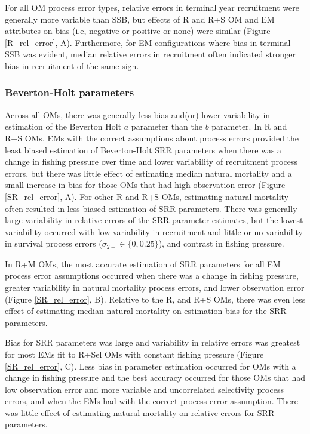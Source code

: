\documentclass[
  12pt,
]{article}
\begin{document}
For all OM process error types, relative errors in terminal year
recruitment were generally more variable than SSB, but effects of R and
R+S OM and EM attributes on bias (i.e, negative or positive or none)
were similar (Figure \ref{R_rel_error}, A). Furthermore, for EM
configurations where bias in terminal SSB was evident, median relative
errors in recruitment often indicated stronger bias in recruitment of
the same sign.

\hypertarget{beverton-holt-parameters}{%
\subsubsection*{Beverton-Holt
parameters}\label{beverton-holt-parameters}}

Across all OMs, there was generally less bias and(or) lower variability
in estimation of the Beverton Holt \(a\) parameter than the \(b\)
parameter. In R and R+S OMs, EMs with the correct assumptions about
process errors provided the least biased estimation of Beverton-Holt SRR
parameters when there was a change in fishing pressure over time and
lower variability of recruitment process errors, but there was little
effect of estimating median natural mortality and a small increase in
bias for those OMs that had high observation error (Figure
\ref{SR_rel_error}, A). For other R and R+S OMs, estimating natural
mortality often resulted in less biased estimation of SRR parameters.
There was generally large variability in relative errors of the SRR
parameter estimates, but the lowest variability occurred with low
variability in recruitment and little or no variability in survival
process errors (\(\sigma_{2+} \in \{0,0.25\}\)), and contrast in fishing
pressure.

In R+M OMs, the most accurate estimation of SRR parameters for all EM
process error assumptions occurred when there was a change in fishing
pressure, greater variability in natural mortality process errors, and
lower observation error (Figure \ref{SR_rel_error}, B). Relative to the
R, and R+S OMs, there was even less effect of estimating median natural
mortality on estimation bias for the SRR parameters.

Bias for SRR parameters was large and variability in relative errors was
greatest for most EMs fit to R+Sel OMs with constant fishing pressure
(Figure \ref{SR_rel_error}, C). Less bias in parameter estimation
occurred for OMs with a change in fishing pressure and the best accuracy
occurred for those OMs that had low observation error and more variable
and uncorrelated selectivity process errors, and when the EMs had with
the correct process error assumption. There was little effect of
estimating natural mortality on relative errors for SRR parameters.
\end{document}

